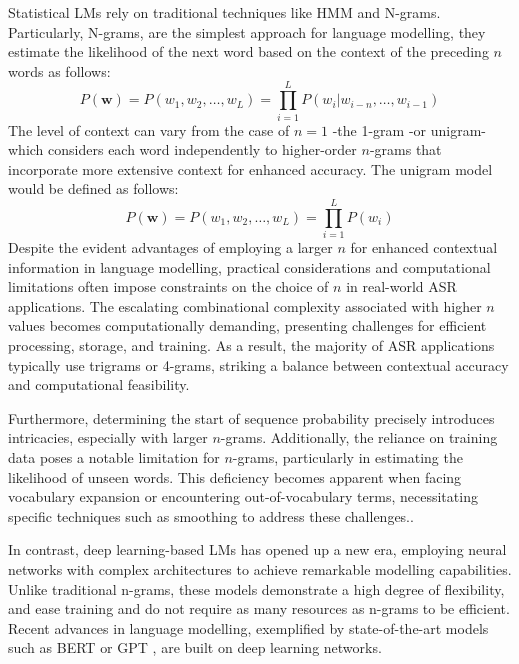 Statistical \acp{LM} rely on traditional techniques like \ac{HMM} and N-grams. Particularly, N-grams, are the simplest approach for language modelling, they estimate the likelihood of the next word based on the context of the preceding $n$ words as follows:
\begin{equation}
    P(\boldsymbol{w})= P(w_1 , w_2 ,\dots,w_L)  =\prod_{i=1}^L P(w_i| w_{i-n} , \dots,w_{i-1}  )
\end{equation}
The level of context can vary from the case of $n=1$ -the 1-gram -or unigram- which considers each word independently to higher-order $n$-grams that incorporate more extensive context for enhanced accuracy. The unigram model would be defined as follows:
\begin{equation}
    P(\boldsymbol{w})=P(w_1, w_2,\dots,w_L )  = \prod_{i=1}^L P(w_i)
\end{equation}
Despite the evident advantages of employing a larger $n$ for enhanced contextual information in language modelling, practical considerations and computational limitations often impose constraints on the choice of $n$ in real-world \ac{ASR} applications. The escalating combinational complexity associated with higher $n$ values becomes computationally demanding, presenting challenges for efficient processing, storage, and training. As a result, the majority of \ac{ASR} applications typically use trigrams or 4-grams, striking a balance between contextual accuracy and computational feasibility.

Furthermore, determining the start of sequence probability precisely introduces intricacies, especially with larger $n$-grams. Additionally, the reliance on training data poses a notable limitation for $n$-grams, particularly in estimating the likelihood of unseen words. This deficiency becomes apparent when facing vocabulary expansion or encountering out-of-vocabulary terms, necessitating specific techniques such as smoothing to address these challenges.\cite{n-grams-smoothing}.

In contrast, deep learning-based \acp{LM} has opened up a new era, employing neural networks with complex architectures to achieve remarkable modelling capabilities. Unlike traditional n-grams, these models demonstrate a high degree of flexibility, and ease training and do not require as many resources as n-grams to be efficient. Recent advances in language modelling, exemplified by state-of-the-art models such as \ac{BERT} \cite{Bert} or \ac{GPT} \cite{brown2020language}, are built on deep learning networks.


